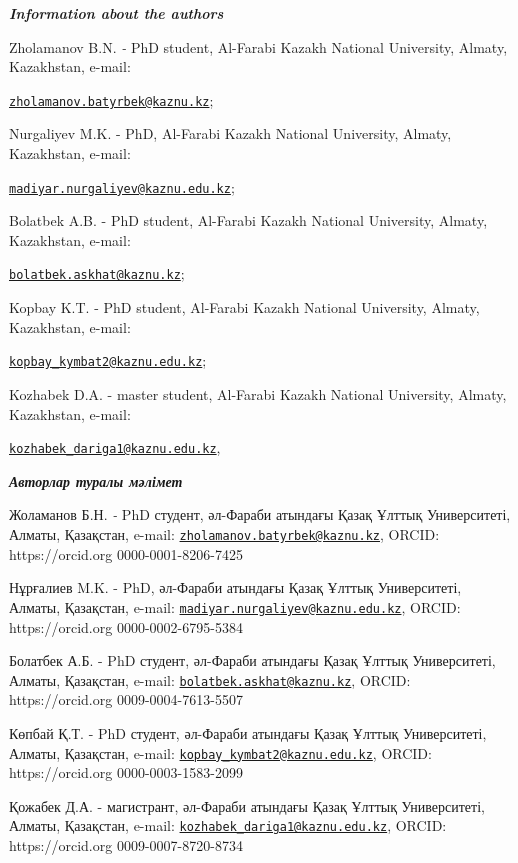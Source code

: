 \begin{authorinfo}
\emph{{\bfseries Information about the authors}}

Zholamanov B.N. \emph{-} PhD student, Al-Farabi Kazakh National
University, Almaty, Kazakhstan, e-mail:

\href{mailto:zholamanov.batyrbek@kaznu.kz}{\nolinkurl{zholamanov.batyrbek@kaznu.kz}};

Nurgaliyev M.K. - PhD, Al-Farabi Kazakh National University, Almaty,
Kazakhstan, e-mail:

\href{mailto:madiyar.nurgaliyev@kaznu.edu.kz}{\nolinkurl{madiyar.nurgaliyev@kaznu.edu.kz}};

Bolatbek A.B. - PhD student, Al-Farabi Kazakh National University,
Almaty, Kazakhstan, e-mail:

\href{mailto:bolatbek.askhat@kaznu.kz}{\nolinkurl{bolatbek.askhat@kaznu.kz}};

Kopbay K.T. - PhD student, Al-Farabi Kazakh National University, Almaty,
Kazakhstan, e-mail:

\href{mailto:kopbay_kymbat2@kaznu.edu.kz}{\nolinkurl{kopbay\_kymbat2@kaznu.edu.kz}};

Kozhabek D.A. - master student, Al-Farabi Kazakh National University,
Almaty, Kazakhstan, e-mail:

\href{mailto:kozhabek_dariga1@kaznu.edu.kz}{\nolinkurl{kozhabek\_dariga1@kaznu.edu.kz}},

\emph{{\bfseries Авторлар туралы мәлімет}}

Жоламанов Б.Н. \emph{-} PhD студент, әл-Фараби атындағы Қазақ Ұлттық
Университеті, Алматы, Қазақстан, e-mail:
\href{mailto:zholamanov.batyrbek@kaznu.kz}{\nolinkurl{zholamanov.batyrbek@kaznu.kz}},
ORCID: https://orcid.org 0000-0001-8206-7425

Нұрғалиев M.K. - PhD, әл-Фараби атындағы Қазақ Ұлттық Университеті,
Алматы, Қазақстан, e-mail:
\href{mailto:madiyar.nurgaliyev@kaznu.edu.kz}{\nolinkurl{madiyar.nurgaliyev@kaznu.edu.kz}},
ORCID: https://orcid.org 0000-0002-6795-5384

Болатбек А.Б. - PhD студент, әл-Фараби атындағы Қазақ Ұлттық
Университеті, Алматы, Қазақстан, e-mail:
\href{mailto:bolatbek.askhat@kaznu.kz}{\nolinkurl{bolatbek.askhat@kaznu.kz}},
ORCID: https://orcid.org 0009-0004-7613-5507

Көпбай Қ.Т. - PhD студент, әл-Фараби атындағы Қазақ Ұлттық Университеті,
Алматы, Қазақстан, e-mail:
\href{mailto:kopbay_kymbat2@kaznu.edu.kz}{\nolinkurl{kopbay\_kymbat2@kaznu.edu.kz}},
ORCID: https://orcid.org 0000-0003-1583-2099

Қожабек Д.А. - магистрант, әл-Фараби атындағы Қазақ Ұлттық Университеті,
Алматы, Қазақстан, e-mail:
\href{mailto:kozhabek_dariga1@kaznu.edu.kz}{\nolinkurl{kozhabek\_dariga1@kaznu.edu.kz}},
ORCID: https://orcid.org 0009-0007-8720-8734\
\end{authorinfo}
